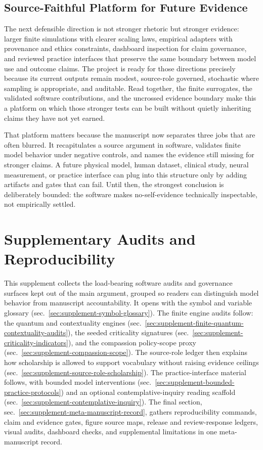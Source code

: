 \documentclass[
]{article}
\begin{document}
\subsection{Source-Faithful Platform for Future
Evidence}\label{sec:conclusion-source-faithful-platform}

The next defensible direction is not stronger rhetoric but stronger
evidence: larger finite simulations with clearer scaling laws, empirical
adapters with provenance and ethics constraints, dashboard inspection
for claim governance, and reviewed practice interfaces that preserve the
same boundary between model use and outcome claims. The project is ready
for those directions precisely because its current outputs remain
modest, source-role governed, stochastic where sampling is appropriate,
and auditable. Read together, the finite surrogates, the validated
software contributions, and the uncrossed evidence boundary make this a
platform on which those stronger tests can be built without quietly
inheriting claims they have not yet earned.

That platform matters because the manuscript now separates three jobs
that are often blurred. It recapitulates a source argument in software,
validates finite model behavior under negative controls, and names the
evidence still missing for stronger claims. A future physical model,
human dataset, clinical study, neural measurement, or practice interface
can plug into this structure only by adding artifacts and gates that can
fail. Until then, the strongest conclusion is deliberately bounded: the
software makes no-self-evidence technically inspectable, not empirically
settled.

\newpage

\section{Supplementary Audits and Reproducibility}\label{sec:supplement}

This supplement collects the load-bearing software audits and governance
surfaces kept out of the main argument, grouped so readers can
distinguish model behavior from manuscript accountability. It opens with
the symbol and variable glossary
(sec.~\ref{sec:supplement-symbol-glossary}). The finite engine audits
follow: the quantum and contextuality engines
(sec.~\ref{sec:supplement-finite-quantum-contextuality-audits}), the
seeded criticality signatures
(sec.~\ref{sec:supplement-criticality-indicators}), and the compassion
policy-scope proxy (sec.~\ref{sec:supplement-compassion-scope}). The
source-role ledger then explains how scholarship is allowed to support
vocabulary without raising evidence ceilings
(sec.~\ref{sec:supplement-source-role-scholarship}). The
practice-interface material follows, with bounded model interventions
(sec.~\ref{sec:supplement-bounded-practice-protocols}) and an optional
contemplative-inquiry reading scaffold
(sec.~\ref{sec:supplement-contemplative-inquiry}). The final section,
sec.~\ref{sec:supplement-meta-manuscript-record}, gathers
reproducibility commands, claim and evidence gates, figure source maps,
release and review-response ledgers, visual audits, dashboard checks,
and supplemental limitations in one meta-manuscript record.
\end{document}
